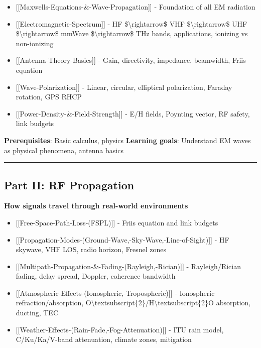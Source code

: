 \begin{itemize}
\tightlist
\item
  {[}{[}Maxwell\textquotesingle s-Equations-\&-Wave-Propagation{]}{]} -
  Foundation of all EM radiation
\item
  {[}{[}Electromagnetic-Spectrum{]}{]} - HF
  \$\textbackslash rightarrow\$ VHF \$\textbackslash rightarrow\$ UHF
  \$\textbackslash rightarrow\$ mmWave \$\textbackslash rightarrow\$ THz
  bands, applications, ionizing vs non-ionizing
\item
  {[}{[}Antenna-Theory-Basics{]}{]} - Gain, directivity, impedance,
  beamwidth, Friis equation
\item
  {[}{[}Wave-Polarization{]}{]} - Linear, circular, elliptical
  polarization, Faraday rotation, GPS RHCP
\item
  {[}{[}Power-Density-\&-Field-Strength{]}{]} - E/H fields, Poynting
  vector, RF safety, link budgets
\end{itemize}

\textbf{Prerequisites}: Basic calculus, physics \textbf{Learning goals}:
Understand EM waves as physical phenomena, antenna basics

\begin{center}\rule{0.5\linewidth}{0.5pt}\end{center}

\subsection{\texorpdfstring{ Part II: RF
Propagation}{ Part II: RF Propagation}}\label{part-ii-rf-propagation}

\textbf{How signals travel through real-world environments}

\begin{itemize}
\tightlist
\item
  {[}{[}Free-Space-Path-Loss-(FSPL){]}{]} - Friis equation and link
  budgets
\item
  {[}{[}Propagation-Modes-(Ground-Wave,-Sky-Wave,-Line-of-Sight){]}{]} -
  HF skywave, VHF LOS, radio horizon, Fresnel zones
\item
  {[}{[}Multipath-Propagation-\&-Fading-(Rayleigh,-Rician){]}{]} -
  Rayleigh/Rician fading, delay spread, Doppler, coherence bandwidth
\item
  {[}{[}Atmospheric-Effects-(Ionospheric,-Tropospheric){]}{]} -
  Ionospheric refraction/absorption,
  O\textbackslash textsubscript\{2\}/H\textbackslash textsubscript\{2\}O
  absorption, ducting, TEC
\item
  {[}{[}Weather-Effects-(Rain-Fade,-Fog-Attenuation){]}{]} - ITU rain
  model, C/Ku/Ka/V-band attenuation, climate zones, mitigation
\end{itemize}

